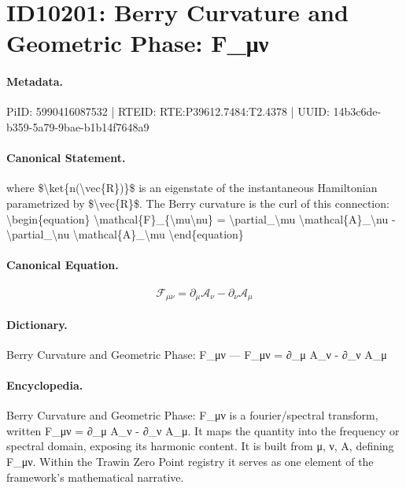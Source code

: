 \section*{ID10201: Berry Curvature and Geometric Phase: F\_μν}
\paragraph{Metadata.}
PiID: 5990416087532 | RTEID: RTE:P39612.7484:T2.4378 | UUID: 14b3c6de-b359-5a79-9bae-b1b14f7648a9

\paragraph{Canonical Statement.}
where \$\textbackslash{}ket\{n(\textbackslash{}vec\{R\})\}\$ is an eigenstate of the instantaneous Hamiltonian parametrized by \$\textbackslash{}vec\{R\}\$. The Berry curvature is the curl of this connection: \textbackslash{}begin\{equation\} \textbackslash{}mathcal\{F\}\_\{\textbackslash{}mu\textbackslash{}nu\} = \textbackslash{}partial\_\textbackslash{}mu \textbackslash{}mathcal\{A\}\_\textbackslash{}nu - \textbackslash{}partial\_\textbackslash{}nu \textbackslash{}mathcal\{A\}\_\textbackslash{}mu \textbackslash{}end\{equation\}

\paragraph{Canonical Equation.}
\[
\mathcal{F}_{\mu\nu} = \partial_\mu \mathcal{A}_\nu - \partial_\nu \mathcal{A}_\mu
\]

\paragraph{Dictionary.}
Berry Curvature and Geometric Phase: F\_μν — F\_μν = ∂\_μ A\_ν - ∂\_ν A\_μ

\paragraph{Encyclopedia.}
Berry Curvature and Geometric Phase: F\_μν is a fourier/spectral transform, written F\_μν = ∂\_μ A\_ν - ∂\_ν A\_μ. It maps the quantity into the frequency or spectral domain, exposing its harmonic content. It is built from μ, ν, A, defining F\_μν. Within the Trawin Zero Point registry it serves as one element of the framework's mathematical narrative.
